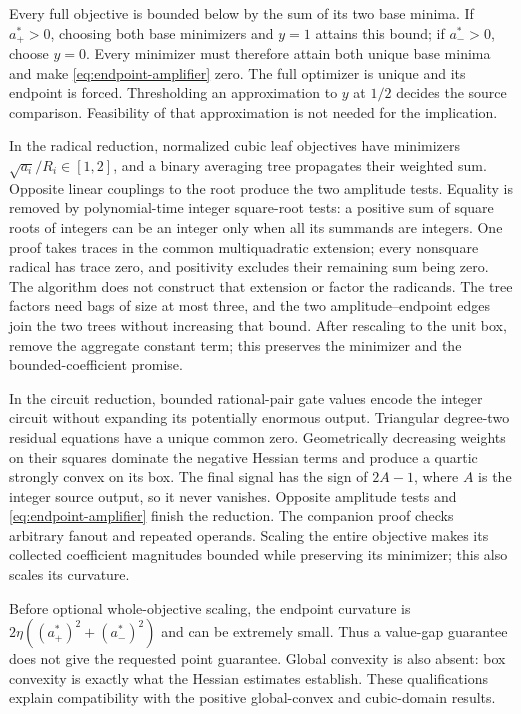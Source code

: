 Every full objective is bounded below by the sum of its two base
minima. If $a_+^*>0$, choosing both base minimizers and $y=1$
attains this bound; if $a_-^*>0$, choose $y=0$. Every minimizer
must therefore attain both unique base minima and make
\eqref{eq:endpoint-amplifier} zero. The full optimizer is unique
and its endpoint is forced. Thresholding an approximation to $y$ at
$1/2$ decides the source comparison. Feasibility of that approximation
is not needed for the implication.

In the radical reduction, normalized cubic leaf objectives have
minimizers $\sqrt{a_i}/R_i\in[1,2]$, and a binary averaging tree
propagates their weighted sum. Opposite linear couplings to the root
produce the two amplitude tests. Equality is removed by polynomial-time
integer square-root tests: a positive sum of square roots of integers
can be an integer only when all its summands are integers. One proof
takes traces in the common multiquadratic extension; every nonsquare
radical has trace zero, and positivity excludes their remaining sum
being zero. The algorithm does not construct that extension or factor
the radicands. The tree factors need bags of size at most three, and
the two amplitude--endpoint edges join the two trees without increasing
that bound. After rescaling to the unit box, remove the aggregate constant
term; this preserves the minimizer and the bounded-coefficient promise.

In the circuit reduction, bounded rational-pair gate values encode the
integer circuit without expanding its potentially enormous output.
Triangular degree-two residual equations have a unique common zero.
Geometrically decreasing weights on their squares dominate the negative
Hessian terms and produce a quartic strongly convex on its box.
The final signal has the sign of $2A-1$, where $A$ is the integer
source output, so it never vanishes. Opposite amplitude tests and
\eqref{eq:endpoint-amplifier} finish the reduction. The companion proof
checks arbitrary fanout and repeated operands. Scaling the entire
objective makes its collected coefficient magnitudes bounded while
preserving its minimizer; this also scales its curvature.

Before optional whole-objective scaling, the endpoint curvature is
$2\eta((a_+^*)^2+(a_-^*)^2)$ and can be extremely small. Thus a
value-gap guarantee does not give the requested point guarantee.
Global convexity is also absent: box convexity is exactly what the
Hessian estimates establish. These qualifications explain compatibility
with the positive global-convex and cubic-domain results.

